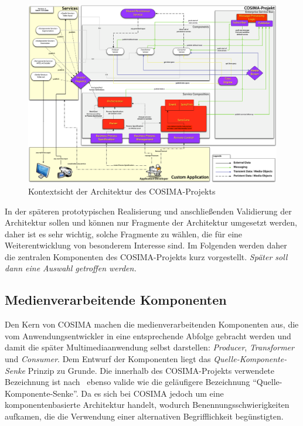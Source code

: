 \begin{figure}[ht]
  \centering
    \includegraphics[width=.9\textwidth]{images/Kontextsicht_Architektur_COSIMA}
  \caption{Kontextsicht der Architektur des COSIMA-Projekts}
  \label{fig:images_Kontextsicht_Architektur_COSIMA}
\end{figure}

  In der späteren prototypischen Realisierung und anschließenden Validierung der Architektur sollen und können nur Fragmente der Architektur umgesetzt werden, daher ist es sehr wichtig, solche Fragmente zu wählen, die für eine Weiterentwicklung von besonderem Interesse sind. Im Folgenden werden daher die zentralen Komponenten des COSIMA-Projekts kurz vorgestellt. \emph{Später soll dann eine Auswahl getroffen werden.}



\subsection{Medienverarbeitende Komponenten} %
\label{sub:medienverarbeitende_komponenten}

  Den Kern von COSIMA machen die medienverarbeitenden Komponenten aus, die vom Anwendungsentwickler in eine entsprechende Abfolge gebracht werden und damit die später Multimediaanwendung selbst darstellen: \emph{Producer}, \emph{Transformer} und \emph{Consumer}. Dem Entwurf der Komponenten liegt das \emph{Quelle-Komponente-Senke} Prinzip zu Grunde. Die innerhalb des COSIMA-Projekts verwendete Bezeichnung ist nach~\citep{a_multimedia_component_kit,multimedia_component_frameworks} ebenso valide wie die geläufigere Bezeichnung "`Quelle-Komponente-Senke"'. Da es sich bei COSIMA jedoch um eine komponentenbasierte Architektur handelt, wodurch Benennungsschwierigkeiten aufkamen, die die Verwendung einer alternativen Begrifflichkeit begünstigten.
  
